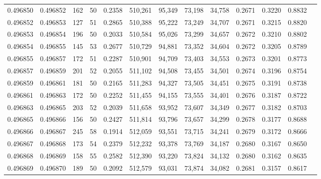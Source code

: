 \begin{tabular}{rrrrrrrrrrrrr}
0.496850 & 0.496852 &   162 &  50 &                                     0.2358 & 510,261 &  95,349 &  73,198 &  34,758 & 0.2671 & 0.3220 & 0.8832 \\
0.496852 & 0.496853 &   127 &  51 &                                     0.2865 & 510,388 &  95,222 &  73,249 &  34,707 & 0.2671 & 0.3215 & 0.8820 \\
0.496853 & 0.496854 &   196 &  50 &                                     0.2033 & 510,584 &  95,026 &  73,299 &  34,657 & 0.2672 & 0.3210 & 0.8802 \\
0.496854 & 0.496855 &   145 &  53 &                                     0.2677 & 510,729 &  94,881 &  73,352 &  34,604 & 0.2672 & 0.3205 & 0.8789 \\
0.496855 & 0.496857 &   172 &  51 &                                     0.2287 & 510,901 &  94,709 &  73,403 &  34,553 & 0.2673 & 0.3201 & 0.8773 \\
0.496857 & 0.496859 &   201 &  52 &                                     0.2055 & 511,102 &  94,508 &  73,455 &  34,501 & 0.2674 & 0.3196 & 0.8754 \\
0.496859 & 0.496861 &   181 &  50 &                                     0.2165 & 511,283 &  94,327 &  73,505 &  34,451 & 0.2675 & 0.3191 & 0.8738 \\
0.496861 & 0.496863 &   172 &  50 &                                     0.2252 & 511,455 &  94,155 &  73,555 &  34,401 & 0.2676 & 0.3187 & 0.8722 \\
0.496863 & 0.496865 &   203 &  52 &                                     0.2039 & 511,658 &  93,952 &  73,607 &  34,349 & 0.2677 & 0.3182 & 0.8703 \\
0.496865 & 0.496866 &   156 &  50 &                                     0.2427 & 511,814 &  93,796 &  73,657 &  34,299 & 0.2678 & 0.3177 & 0.8688 \\
0.496866 & 0.496867 &   245 &  58 &                                     0.1914 & 512,059 &  93,551 &  73,715 &  34,241 & 0.2679 & 0.3172 & 0.8666 \\
0.496867 & 0.496868 &   173 &  54 &                                     0.2379 & 512,232 &  93,378 &  73,769 &  34,187 & 0.2680 & 0.3167 & 0.8650 \\
0.496868 & 0.496869 &   158 &  55 &                                     0.2582 & 512,390 &  93,220 &  73,824 &  34,132 & 0.2680 & 0.3162 & 0.8635 \\
0.496869 & 0.496870 &   189 &  50 &                                     0.2092 & 512,579 &  93,031 &  73,874 &  34,082 & 0.2681 & 0.3157 & 0.8617 \\

\end{tabular}
